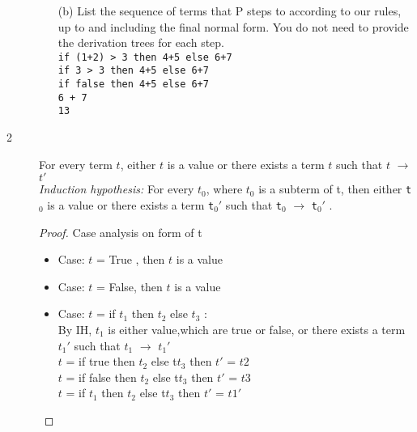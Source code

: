 \documentclass{article}
\begin{document}
\begin{description}
\begin{enumerate}
                \item[(b)]{List the sequence of terms that P steps to according to our rules, up to and including the final normal form.
                You do not need to provide the derivation trees for each step.
                }
                    \\
                    \verb|if (1+2) > 3 then 4+5 else 6+7| \\
                    \verb|if 3 > 3 then 4+5 else 6+7| \\
                    \verb|if false then 4+5 else 6+7| \\
                    \verb|6 + 7| \\
                    \verb|13| \\
            \end{enumerate}
        \item[2] {For every term $t$, either $t$ is a value or there exists a term $t$ such that $t$ $\rightarrow$ $t'$}\\
                \textit{Induction hypothesis:} For every $t_0$, where $t_0$ is a subterm of t, then  either \verb|t|$_0$ is a value or there exists a term \verb|t|$_0'$  such that \verb|t|$_0$  $\rightarrow$ \verb|t|$_0'$ .
                \begin{proof}
                    Case analysis on form of t
                    \begin{itemize}
                        \item Case: $t$ = True , then $t$ is a value
                        \item Case: $t$ = False, then $t$ is a value
                        \item Case: $t$ = if $t_1$ then $t_2$ else $t_3$ :\\
                                By IH, $t_1$ is either value,which are true or false, or there exists a term $t_1'$  such that $t_1$  $\rightarrow$ $t_1'$ \\
                                $t$ = if true then $t_2$ else t$t_3$ then $t'$ = $t2$ \\
                                $t$ = if false then $t_2$ else t$t_3$ then $t'$ = $t3$ \\
                                $t$ = if $t_1$ then $t_2$ else t$t_3$ then $t'$ = $t1'$ \\


\end{itemize}
\end{proof}
\end{description}
\end{document}
